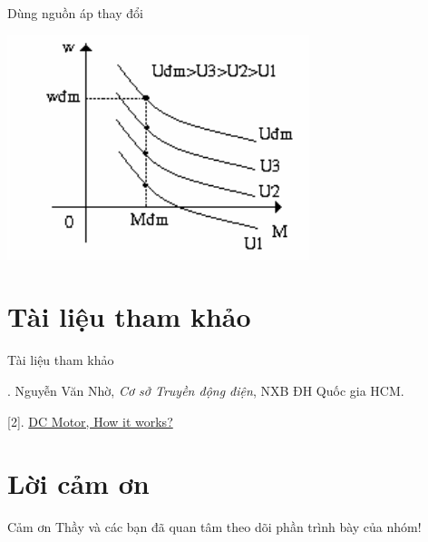 \documentclass[24pt]{beamer}
\begin{document}
\begin{frame}{Dùng nguồn áp thay đổi}
\vspace{-.3cm}
\begin{center}
	\includegraphics[scale=.75]{images-chude4/khongdong-kichtu-noitiep-2-1.png} 
\end{center}
\end{frame}

\section*{Tài liệu tham khảo}
\begin{frame}{Tài liệu tham khảo}
\begin{small}
\justifying
[1]. Nguyễn Văn Nhờ, \textit{Cơ sở Truyền động điện}, NXB ĐH Quốc gia HCM.

[2]. \href{https://www.youtube.com/watch?v=LAtPHANEfQo}{DC Motor, How it works?}
\end{small}
\end{frame}
\section*{Lời cảm ơn}
\begin{frame}
\justifying
\large \alert{Cảm ơn Thầy và các bạn đã quan tâm theo dõi phần trình bày của nhóm!}
\end{frame}
\end{document}
